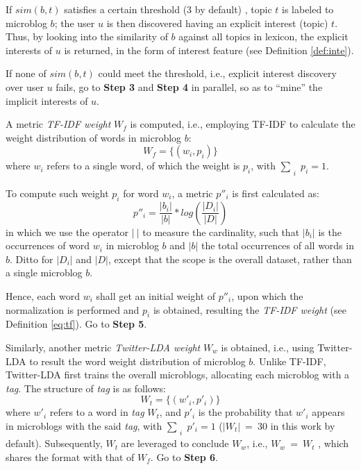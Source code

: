 If $sim(b, t)$ satisfies a certain threshold (3 by default) , topic $t$ is labeled to microblog $b$;
the user $u$ is then discovered having an explicit interest (topic) $t$.
Thus, by looking into the similarity of $b$ against all topics in lexicon, the explicit interests of $u$ is returned, in the form of interest feature (see Definition \ref{def:inte}).

If none of $sim(b, t)$ could meet the threshold, i.e., explicit interest discovery over user $u$ fails, go to \textbf{Step 3} and \textbf{Step 4} in parallel, so as to ``mine'' the implicit interests of $u$.

 A metric \textit{TF-IDF weight} $W_f$ is computed, i.e., employing TF-IDF to calculate the weight distribution of words in microblog $b$:
\begin{equation}
\label{eq:tf}
W_f = \{(w_i, p_i)\}
\end{equation}
where $w_i$ refers to a single word, of which the weight is $p_i$, with $\sum_{\substack{i}} p_i = 1$.

To compute such weight $p_i$ for word $w_i$, a metric $p''_i$ is first calculated as:
\begin{equation}
\label{eq:tf-w}
p''_i = \frac{|b_i|}{|b|} * log(\frac{|D_i|}{|D|})
\end{equation}
in which we use the operator $|\ |$ to measure the cardinality, such that $|b_i|$ is the occurrences of word $w_i$ in microblog $b$ and $|b|$ the total occurrences of all words in $b$.
Ditto for $|D_i|$ and $|D|$, except that the scope is the overall dataset, rather than a single microblog $b$.

Hence, each word $w_i$ shall get an initial weight of $p''_i$, upon which the normalization is performed and $p_i$ is obtained, resulting the \textit{TF-IDF weight} (see Definition \ref{eq:tf}).
Go to \textbf{Step 5}.

 Similarly, another metric \textit{Twitter-LDA weight} $W_w$ is obtained, i.e., using Twitter-LDA  %
to result the word weight distribution of microblog $b$.
Unlike TF-IDF, Twitter-LDA first trains the overall microblogs, allocating each microblog with a \textit{tag}.
%
The structure of \textit{tag} is as follows:
\begin{equation}
\label{eq:tw-tag}
W_t = \{(w'_i, p'_i)\}
\end{equation}
where $w'_i$ refers to a word in \textit{tag} $W_t$, and $p'_i$ is the probability that $w'_i$ appears in microblogs with the said \textit{tag}, with $\sum_{\substack{i}} p'_i = 1$ ($|W_t|\ =\ 30$ in this work by default).
%
Subsequently, $W_t$ are leveraged to conclude $W_w$, i.e., $W_w\ =\ W_t$ , which shares the format with that of $W_f$.
Go to \textbf{Step 6}.

